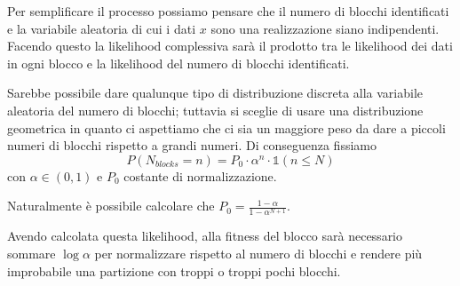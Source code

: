 \documentclass[10pt,a4paper]{report}
\begin{document}
Per semplificare il processo possiamo pensare che il numero di blocchi identificati e la variabile aleatoria di cui i dati $x$ sono una realizzazione siano indipendenti. Facendo questo la likelihood complessiva sarà il prodotto tra le likelihood dei dati in ogni blocco e la likelihood del numero di blocchi identificati.

Sarebbe possibile dare qualunque tipo di distribuzione discreta alla variabile aleatoria del numero di blocchi; tuttavia si sceglie di usare una distribuzione geometrica in quanto ci aspettiamo che ci sia un maggiore peso da dare a piccoli numeri di blocchi rispetto a grandi numeri. Di conseguenza fissiamo 
$$P(N_{blocks}=n)=P_0\cdot\alpha^n\cdot\mathds{1}(n\leq N)$$
con $\alpha\in(0,1)$ e $P_0$ costante di normalizzazione.

Naturalmente è possibile calcolare che $P_0 = \frac{1-\alpha}{1-\alpha^{N+1}}$.

Avendo calcolata questa likelihood, alla fitness del blocco sarà necessario sommare $\log\alpha$ per normalizzare rispetto al numero di blocchi e rendere più improbabile una partizione con troppi o troppi pochi blocchi.
\end{document}
